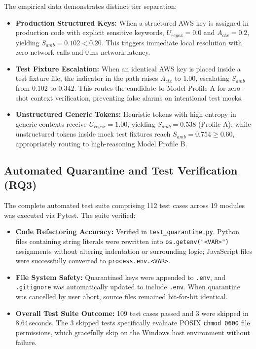 The empirical data demonstrates distinct tier separation:
\begin{itemize}
    \item \textbf{Production Structured Keys:} When a structured AWS key is assigned in production code with explicit sensitive keywords, $U_{regex} = 0.0$ and $A_{ctx} = 0.2$, yielding $S_{amb} = 0.102 < 0.20$. This triggers immediate local resolution with zero network calls and 0\,ms network latency.
    \item \textbf{Test Fixture Escalation:} When an identical AWS key is placed inside a test fixture file, the indicator in the path raises $A_{ctx}$ to $1.00$, escalating $S_{amb}$ from $0.102$ to $0.342$. This routes the candidate to Model Profile A for zero-shot context verification, preventing false alarms on intentional test mocks.
    \item \textbf{Unstructured Generic Tokens:} Heuristic tokens with high entropy in generic contexts receive $U_{regex} = 1.00$, yielding $S_{amb} = 0.538$ (Profile A), while unstructured tokens inside mock test fixtures reach $S_{amb} = 0.754 \ge 0.60$, appropriately routing to high-reasoning Model Profile B.
\end{itemize}

\subsection{Automated Quarantine and Test Verification (RQ3)}
The complete automated test suite comprising 112 test cases across 19 modules was executed via Pytest. The suite verified:
\begin{itemize}
    \item \textbf{Code Refactoring Accuracy:} Verified in \texttt{test\_quarantine.py}. Python files containing string literals were rewritten into \texttt{os.getenv("<VAR>")} assignments without altering indentation or surrounding logic; JavaScript files were successfully converted to \texttt{process.env.<VAR>}.
    \item \textbf{File System Safety:} Quarantined keys were appended to \texttt{.env}, and \texttt{.gitignore} was automatically updated to include \texttt{.env}. When quarantine was cancelled by user abort, source files remained bit-for-bit identical.
    \item \textbf{Overall Test Suite Outcome:} 109 test cases passed and 3 were skipped in $8.64$\,seconds. The 3 skipped tests specifically evaluate POSIX \texttt{chmod 0600} file permissions, which gracefully skip on the Windows host environment without failure.
\end{itemize}

